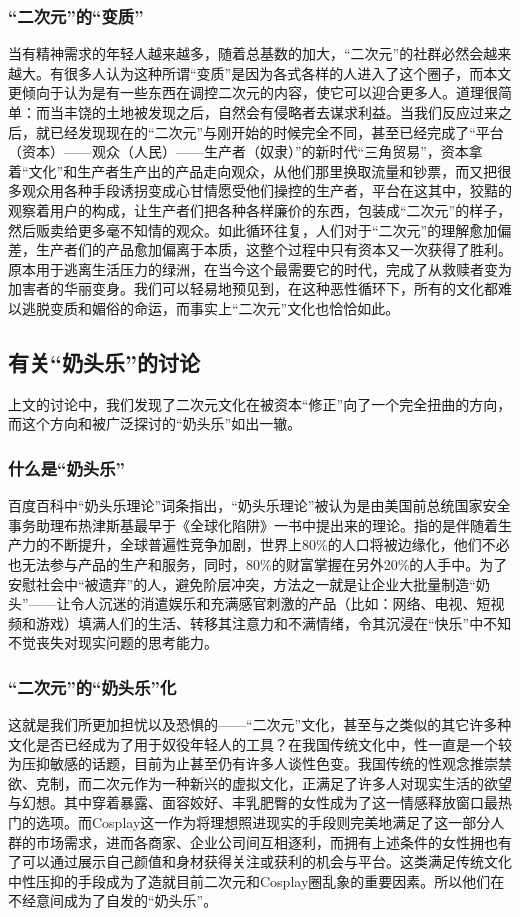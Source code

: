 \documentclass[a4paper]{article}
\begin{document}
	\subsubsection{“二次元”的“变质”}
	当有精神需求的年轻人越来越多，随着总基数的加大，“二次元”的社群必然会越来越大。有很多人认为这种所谓“变质”是因为各式各样的人进入了这个圈子，而本文更倾向于认为是有一些东西在调控二次元的内容，使它可以迎合更多人。道理很简单：而当丰饶的土地被发现之后，自然会有侵略者去谋求利益。当我们反应过来之后，就已经发现现在的“二次元”与刚开始的时候完全不同，甚至已经完成了“平台（资本）——观众（人民）——生产者（奴隶）”的新时代“三角贸易”，资本拿着“文化”和生产者生产出的产品走向观众，从他们那里换取流量和钞票，而又把很多观众用各种手段诱拐变成心甘情愿受他们操控的生产者，平台在这其中，狡黠的观察着用户的构成，让生产者们把各种各样廉价的东西，包装成“二次元”的样子，然后贩卖给更多毫不知情的观众。如此循环往复，人们对于“二次元”的理解愈加偏差，生产者们的产品愈加偏离于本质，这整个过程中只有资本又一次获得了胜利。原本用于逃离生活压力的绿洲，在当今这个最需要它的时代，完成了从救赎者变为加害者的华丽变身。我们可以轻易地预见到，在这种恶性循环下，所有的文化都难以逃脱变质和媚俗的命运，而事实上“二次元”文化也恰恰如此。
	\subsection{有关“奶头乐”的讨论}
	上文的讨论中，我们发现了二次元文化在被资本“修正”向了一个完全扭曲的方向，而这个方向和被广泛探讨的“奶头乐”如出一辙。
	\subsubsection{什么是“奶头乐”}
	百度百科中“奶头乐理论”词条指出\cite{ref4}，“奶头乐理论”被认为是由美国前总统国家安全事务助理布热津斯基最早于《全球化陷阱》一书中提出来的理论。指的是伴随着生产力的不断提升，全球普遍性竞争加剧，世界上80\%的人口将被边缘化，他们不必也无法参与产品的生产和服务，同时，80\%的财富掌握在另外20\%的人手中。为了安慰社会中“被遗弃”的人，避免阶层冲突，方法之一就是让企业大批量制造“奶头”——让令人沉迷的消遣娱乐和充满感官刺激的产品（比如：网络、电视、短视频和游戏）填满人们的生活、转移其注意力和不满情绪，令其沉浸在“快乐”中不知不觉丧失对现实问题的思考能力。\\
	
	\subsubsection{“二次元”的“奶头乐”化}
	这就是我们所更加担忧以及恐惧的——“二次元”文化，甚至与之类似的其它许多种文化是否已经成为了用于奴役年轻人的工具？在我国传统文化中，性一直是一个较为压抑敏感的话题，目前为止甚至仍有许多人谈性色变。我国传统的性观念推崇禁欲、克制，而二次元作为一种新兴的虚拟文化，正满足了许多人对现实生活的欲望与幻想。其中穿着暴露、面容姣好、丰乳肥臀的女性成为了这一情感释放窗口最热门的选项。而Cosplay这一作为将理想照进现实的手段则完美地满足了这一部分人群的市场需求，进而各商家、企业公司间互相逐利，而拥有上述条件的女性拥也有了可以通过展示自己颜值和身材获得关注或获利的机会与平台。这类满足传统文化中性压抑的手段成为了造就目前二次元和Cosplay圈乱象的重要因素。所以他们在不经意间成为了自发的“奶头乐”。\\
	
\end{document}
